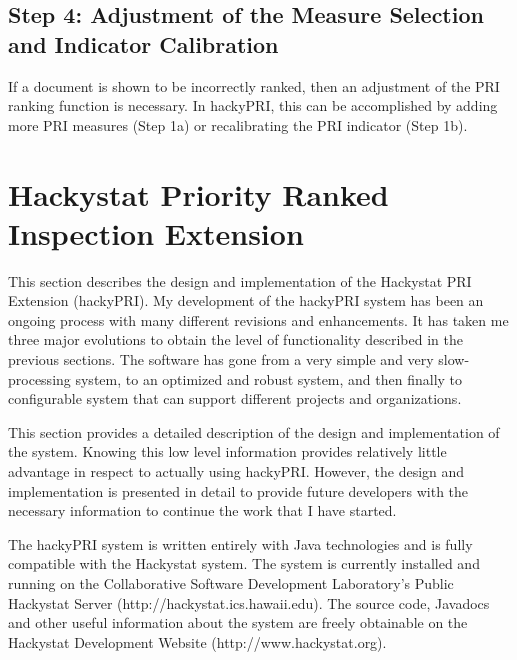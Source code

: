 \subsection{Step 4: Adjustment of the Measure Selection and Indicator Calibration}
If a document is shown to be incorrectly ranked, then an adjustment of the
PRI ranking function is necessary. In hackyPRI, this can be accomplished by
adding more PRI measures (Step 1a) or recalibrating the PRI indicator (Step
1b). 




\section{Hackystat Priority Ranked Inspection Extension}
\label{section:designAndImplementation}
This section describes the design and implementation of the Hackystat PRI
Extension (hackyPRI). My development of the hackyPRI system has been an
ongoing process with many different revisions and enhancements. It has
taken me three major evolutions to obtain the level of functionality
described in the previous sections. The software has gone from a very
simple and very slow-processing system, to an optimized and robust system,
and then finally to configurable system that can support different projects
and organizations.

This section provides a detailed description of the design and
implementation of the system. Knowing this low level information provides
relatively little advantage in respect to actually using hackyPRI. However,
the design and implementation is presented in detail to provide future
developers with the necessary information to continue the work that I have
started.

The hackyPRI system is written entirely with Java technologies and is fully
compatible with the Hackystat system. The system is currently installed and
running on the Collaborative Software Development Laboratory's Public
Hackystat Server (http://hackystat.ics.hawaii.edu). The source code,
Javadocs and other useful information about the system are freely
obtainable on the Hackystat Development Website (http://www.hackystat.org).


